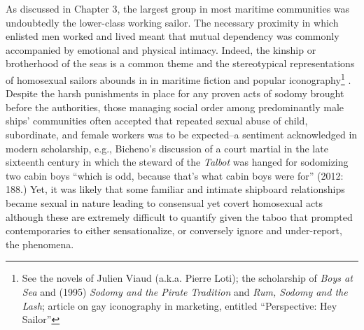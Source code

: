   As discussed in Chapter 3, the largest group in most maritime communities was undoubtedly the lower-class working sailor. The necessary proximity in which enlisted men worked and lived meant that mutual dependency was commonly accompanied by emotional and physical intimacy. Indeed, the kinship or brotherhood of the seas is a common theme and the stereotypical representations of homosexual sailors abounds in in maritime fiction and popular iconography\footnote{See the novels of Julien Viaud (a.k.a. Pierre Loti); the scholarship of  \textit{Boys at Sea} and (1995) \textit{Sodomy and the Pirate Tradition} and  \textit{Rum, Sodomy and the Lash};  article on gay iconography in marketing, entitled “Perspective: Hey Sailor”} . Despite the harsh punishments in place for any proven acts of sodomy brought before the authorities, those managing social order among predominantly male ships’ communities often accepted that repeated sexual abuse of child, subordinate, and female workers was to be expected--a sentiment acknowledged in modern scholarship, e.g., Bicheno’s discussion of a court martial in the late sixteenth century in which the steward of the \textit{Talbot} was hanged for sodomizing two cabin boys “which is odd, because that’s what cabin boys were for” (2012: 188.) Yet, it was likely that some familiar and intimate shipboard relationships became sexual in nature leading to consensual yet covert homosexual acts although these are extremely difficult to quantify given the taboo that prompted contemporaries to either sensationalize, or conversely ignore and under-report, the phenomena. 

